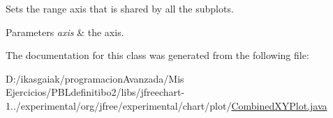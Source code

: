 Sets the range axis that is shared by all the subplots.


\begin{DoxyParams}{Parameters}
{\em axis} & the axis. \\
\hline
\end{DoxyParams}


The documentation for this class was generated from the following file\+:\begin{DoxyCompactItemize}
\item 
D\+:/ikasgaiak/programacion\+Avanzada/\+Mis Ejercicios/\+P\+B\+Ldefinitibo2/libs/jfreechart-\/1../experimental/org/jfree/experimental/chart/plot/\mbox{\hyperlink{_combined_x_y_plot_8java}{Combined\+X\+Y\+Plot.\+java}}\end{DoxyCompactItemize}

